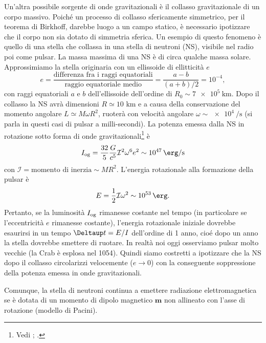 Un'altra possibile sorgente di onde gravitazionali è il collasso gravitazionale
di un corpo massivo.  Poiché un processo di collasso sfericamente simmetrico,
per il teorema di Birkhoff, darebbe luogo a un campo statico, è necessario
ipotizzare che il corpo non sia dotato di simmetria sferica.  Un esempio di
questo fenomeno è quello di una stella che collassa in una stella di neutroni
(NS), visibile nel radio poi come pulsar.  La massa massima di una NS è di circa
qualche massa solare.  Approssimiamo la stella originaria con un ellissoide di
ellitticità $e$
\begin{equation}
  e = \frac{\text{differenza fra i raggi equatoriali}}{\text{raggio equatoriale
      medio}}  = \frac{a-b}{(a+b)/2} = 10^{-4},
\end{equation}
con raggi equatoriali $a$ e $b$ dell'ellissoide dell'ordine di $R_{0} \sim
\SI{7e5}{\kilo\metre}$.  Dopo il collasso la NS avrà dimensioni $R \simeq 10$ km
e a causa della conservazione del momento angolare $L \simeq M \omega R^2$,
ruoterà con velocità angolare $\omega \sim
\SI[per-mode=reciprocal]{e4}{\per\second}$ (si parla in questi casi di pulsar a
milli-secondi).  La potenza emessa dalla NS in rotazione sotto forma di onde
gravitazionali\footnote{Vedi \textcite[488]{shapiro:black-holes};
  \textcite[272]{weinberg:gravitation}.} è
\begin{equation}
  I_{\textup{og}} = \frac{32}{5} \frac{G}{c^{5}} \mathcal{I}^{2} \omega^{6}
  e^{2} \sim \SI{e47}{\erg\per\second}
\end{equation}
con $\mathcal{I} = \text{momento di inerzia} \sim MR^{2}$.  L'energia
rotazionale alla formazione della pulsar è
\begin{equation}
  E = \frac{1}{2} \mathcal{I} \omega^{2} \sim \SI{e53}{\erg}.
\end{equation}
Pertanto, se la luminosità $I_{\textup{og}}$ rimanesse costante nel tempo (in
particolare se l'eccentricità $e$ rimanesse costante), l'energia rotazionale
iniziale dovrebbe esaurirsi in un tempo $\var t = E/I$ dell'ordine di 1 anno,
cio\'e dopo un anno la stella dovrebbe smettere di ruotare.  In realtà noi oggi
osserviamo pulsar molto vecchie (la Crab è esplosa nel 1054).  Quindi siamo
costretti a ipotizzare che la NS dopo il collasso circolarizzi velocemente ($e
\to 0$) con la conseguente soppressione della potenza emessa in onde
gravitazionali.

Comunque, la stella di neutroni continua a emettere radiazione elettromagnetica
se è dotata di un momento di dipolo magnetico $\bm{m}$ non allineato con l'asse
di rotazione (modello di Pacini).


